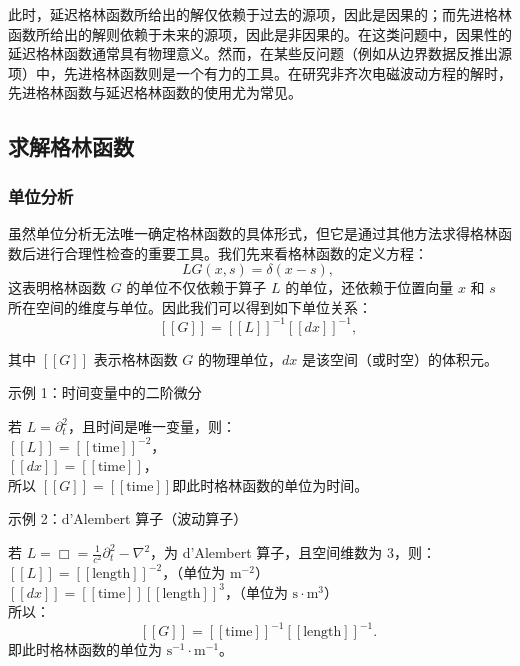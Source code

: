 此时，延迟格林函数所给出的解仅依赖于过去的源项，因此是因果的；而先进格林函数所给出的解则依赖于未来的源项，因此是非因果的。在这类问题中，因果性的延迟格林函数通常具有物理意义。然而，在某些反问题（例如从边界数据反推出源项）中，先进格林函数则是一个有力的工具。在研究非齐次电磁波动方程的解时，先进格林函数与延迟格林函数的使用尤为常见。
\subsection{求解格林函数}
\subsubsection{单位分析}
虽然单位分析无法唯一确定格林函数的具体形式，但它是通过其他方法求得格林函数后进行合理性检查的重要工具。我们先来看格林函数的定义方程：
$$
LG(x, s) = \delta(x - s),~
$$
这表明格林函数 $G$ 的单位不仅依赖于算子 $L$ 的单位，还依赖于位置向量 $x$ 和 $s$ 所在空间的维度与单位。因此我们可以得到如下单位关系：
$$
[[G]] = [[L]]^{-1} [[dx]]^{-1},~
$$

其中 $[[G]]$ 表示格林函数 $G$ 的物理单位，$dx$ 是该空间（或时空）的体积元。

示例 1：时间变量中的二阶微分

若 $L = \partial_t^2$，且时间是唯一变量，则：\\
$[[L]] = [[\text{time}]]^{-2}$，\\
$[[dx]] = [[\text{time}]]$，\\
所以 $[[G]] = [[\text{time}]]$即此时格林函数的单位为时间。

示例 2：d'Alembert 算子（波动算子）

若 $L = \Box = \frac{1}{c^2} \partial_t^2 - \nabla^2$，为 d'Alembert 算子，且空间维数为 3，则：\\
$[[L]] = [[\text{length}]]^{-2}$，（单位为 $\text{m}^{-2}$）\\
$[[dx]] = [[\text{time}]] [[\text{length}]]^3$，（单位为 $\text{s} \cdot \text{m}^3$）\\
所以：
$$
[[G]] = [[\text{time}]]^{-1} [[\text{length}]]^{-1}.~
$$
即此时格林函数的单位为 $\text{s}^{-1} \cdot \text{m}^{-1}$。


